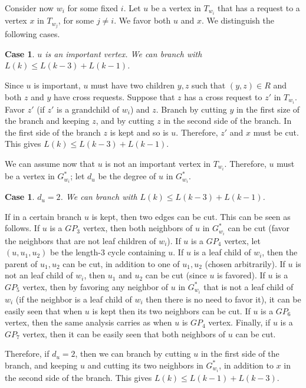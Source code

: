 \documentclass[11pt]{article}
\newtheorem{case}[theorem]{Case}
\begin{document}
Consider now $w_i$ for some fixed $i$. Let $u$ be a vertex in $T_{w_i}$ that has a request to a vertex $x$ in $T_{w_j}$, for some $j\neq i$. We favor both $u$ and $x$.  We distinguish the following cases.

\begin{case}
\label{case:200}
$u$ is an important vertex. We can branch with $L(k) \leq L(k-3) + L(k-1)$.
\end{case}

Since $u$ is important, $u$ must have two children $y, z$ such that $(y, z) \in R$ and both $z$ and $y$ have cross requests. Suppose that $z$ has a cross request to $z'$ in $T_{w_i}$. Favor $z'$ (if $z'$ is a grandchild of $w_i$) and $z$. Branch by cutting $y$ in the first size of the branch and keeping $z$, and by cutting $z$ in the second side of the branch. In the first side of the branch $z$ is kept and so is $u$. Therefore, $z'$ and $x$ must be cut. This gives $L(k) \leq L(k-3) + L(k-1)$.

We can assume now that $u$ is not an important vertex in $T_{w_i}$. Therefore, $u$ must be a vertex in $G^*_{w_i}$; let $d_u$ be the degree of $u$ in $G^*_{w_i}$.

\begin{case}
\label{case:300}
$d_u =2$.  We can branch with $L(k) \leq L(k-3) + L(k-1)$.
\end{case}


If in a certain branch $u$ is kept, then two edges can be cut. This can be seen as follows. If $u$ is a $GP_3$ vertex, then both neighbors of $u$ in $G^*_{w_i}$ can be cut (favor the neighbors that are not leaf children of $w_i$). If $u$ is a $GP_4$ vertex, let $(u, u_1, u_2)$ be the length-3 cycle containing $u$.  If $u$ is a leaf child of $w_i$, then the parent of $u_1, u_2$ can be cut, in addition to one of $u_1, u_2$ (chosen arbitrarily). If $u$ is not an leaf child of $w_i$, then $u_1$ and $u_2$ can be cut (since $u$ is favored). If $u$ is a $GP_5$ vertex, then by favoring any neighbor of $u$ in $G^*_{w_i}$ that is not a leaf child of $w_i$ (if the neighbor is a leaf child of $w_i$ then there is no need to favor it), it can be easily seen that when $u$ is kept then its two neighbors can be cut. If $u$ is a $GP_6$ vertex, then the same analysis carries as when $u$ is $GP_4$ vertex. Finally, if $u$ is a $GP_7$ vertex, then it can be easily seen that both neighbors of $u$ can be cut.

Therefore, if $d_u=2$, then we can branch by cutting $u$ in the first side of the branch, and keeping $u$ and cutting its two neighbors in $G^*_{w_i}$, in addition to $x$ in the second side of the branch. This gives $L(k) \leq L(k-1) + L(k-3)$.
\end{document}
